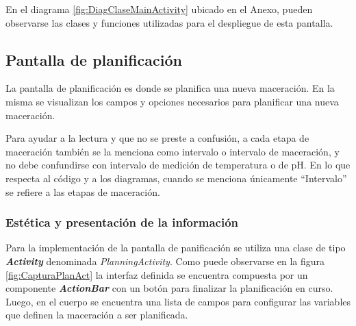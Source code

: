                 \par En el diagrama \ref{fig:DiagClaseMainActivity} ubicado en el Anexo, pueden observarse las clases y funciones utilizadas para el despliegue de esta pantalla.
                
                
        \subsection{Pantalla de planificación}
        \label{DescripPantallaPlanificación}
            \par La pantalla de planificación es donde se planifica una nueva maceración. En la misma se visualizan los campos y opciones necesarios para planificar una nueva maceración. 
            \par Para ayudar a la lectura y que no se preste a confusión, a cada etapa de maceración también se la menciona como intervalo o intervalo de maceración, y no debe confundirse con intervalo de medición de temperatura o de pH. En lo que respecta al código y a los diagramas, cuando se menciona únicamente ``Intervalo'' se refiere a las etapas de maceración.
        
        \subsubsection{Estética y presentación de la información}
                \par Para la implementación de la pantalla de panificación se utiliza una clase de tipo \textbf{\textit{\gls{Activity}}} denominada \textit{PlanningActivity}. Como puede observarse en la figura \ref{fig:CapturaPlanAct} la interfaz definida se encuentra compuesta por un componente \textbf{\textit{\gls{ActionBar}}} con un botón para finalizar la planificación en curso. Luego, en el cuerpo se encuentra una lista de campos para configurar las variables que definen la maceración a ser planificada.
                
